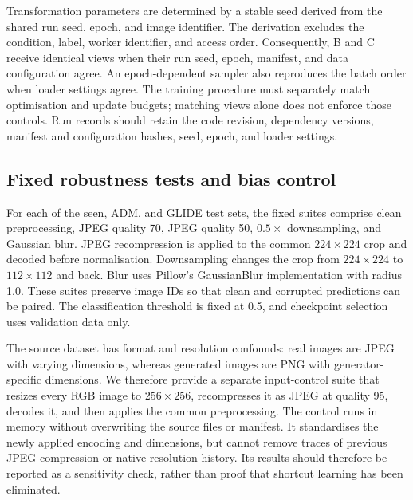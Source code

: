 Transformation parameters are determined by a stable seed derived from the
shared run seed, epoch, and image identifier. The derivation excludes the
condition, label, worker identifier, and access order. Consequently, B and C
receive identical views when their run seed, epoch, manifest, and data
configuration agree. An epoch-dependent sampler also reproduces the batch
order when loader settings agree. The training procedure must separately
match optimisation and update budgets; matching views alone does not enforce
those controls. Run records should retain the code revision, dependency
versions, manifest and configuration hashes, seed, epoch, and loader settings.

\subsection{Fixed robustness tests and bias control}
\label{sec:ouyang-robustness}
For each of the seen, ADM, and GLIDE test sets, the fixed suites comprise
clean preprocessing, JPEG quality 70, JPEG quality 50, $0.5\times$
downsampling, and Gaussian blur. JPEG recompression is applied to the common
$224\times224$ crop and decoded before normalisation. Downsampling changes
the crop from $224\times224$ to $112\times112$ and back. Blur uses Pillow's
GaussianBlur implementation with radius 1.0. These suites preserve image IDs
so that clean and corrupted predictions can be paired. The classification
threshold is fixed at 0.5, and checkpoint selection uses validation data only.

The source dataset has format and resolution confounds: real images are JPEG
with varying dimensions, whereas generated images are PNG with
generator-specific dimensions. We therefore provide a separate input-control
suite that resizes every RGB image to $256\times256$, recompresses it as JPEG
at quality 95, decodes it, and then applies the common preprocessing. The
control runs in memory without overwriting the source files or manifest.
It standardises the newly applied encoding and dimensions, but cannot remove
traces of previous JPEG compression or native-resolution history. Its
results should therefore be reported as a sensitivity check, rather than
proof that shortcut learning has been eliminated.

